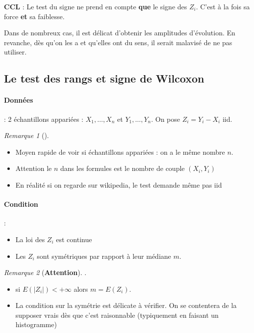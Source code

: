 \documentclass{article}
\theoremstyle{plain}%
\theoremstyle{definition}
\theoremstyle{remark}
\newtheorem*{rem}{Remarque}
\begin{document}
\textbf{CCL} : Le test du signe ne prend en compte \textbf{que} le signe des $ Z_i $. C'est à la fois sa force \textbf{et} sa faiblesse. 

Dans de nombreux cas, il est délicat d'obtenir les amplitudes d'évolution. En revanche, dès qu'on les a et qu'elles ont du sens, il serait malavisé de ne pas utiliser. 

\subsection{Le test des rangs et signe de Wilcoxon}
\paragraph*{Données}: 2 échantillons appariées : $ X_1, \dots, X_n $ et $ Y_1, \dots, Y_n $. On pose $ Z_i = Y_i - X_i $ iid.
\begin{rem}[]
    \begin{itemize}
        \item Moyen rapide de voir si échantillons appariées : on a le même nombre $ n $.
        \item Attention le $ n $ dans les formules est le nombre de couple $ (X_i, Y_i) $ 
        \item En réalité si on regarde sur wikipedia, le test demande même pas iid
    \end{itemize}
\end{rem}

\paragraph*{Condition}:
\begin{itemize}
    \item La loi des $ Z_i $ est continue
    \item Les $ Z_i $ sont symétriques par rapport à leur médiane $ m $.
\end{itemize}
\begin{rem}[\textbf{Attention}].
    \begin{itemize}
        \item si $ E(\left| Z_i \right| ) < + \infty $ alors $ m = E(Z_i) $. 
        \item La condition sur la symétrie est délicate à vérifier. On se contentera de la supposer vrais dès que c'est raisonnable (typiquement en faisant un histogramme) \\
    \end{itemize}
\end{rem}
\end{document}
